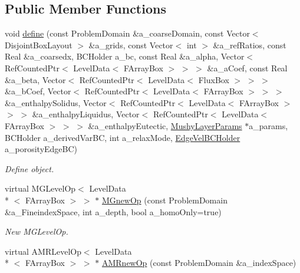 \subsection*{Public Member Functions}
\begin{DoxyCompactItemize}
\item 
void \hyperlink{class_a_m_r_non_linear_multi_comp_op_factory_a197bda0900c2f6315d509a8176b738df}{define} (const Problem\-Domain \&a\-\_\-coarse\-Domain, const Vector$<$ Disjoint\-Box\-Layout $>$ \&a\-\_\-grids, const Vector$<$ int $>$ \&a\-\_\-ref\-Ratios, const Real \&a\-\_\-coarsedx, B\-C\-Holder a\-\_\-bc, const Real \&a\-\_\-alpha, Vector$<$ Ref\-Counted\-Ptr$<$ Level\-Data$<$ F\-Array\-Box $>$ $>$ $>$ \&a\-\_\-a\-Coef, const Real \&a\-\_\-beta, Vector$<$ Ref\-Counted\-Ptr$<$ Level\-Data$<$ Flux\-Box $>$ $>$ $>$ \&a\-\_\-b\-Coef, Vector$<$ Ref\-Counted\-Ptr$<$ Level\-Data$<$ F\-Array\-Box $>$ $>$ $>$ \&a\-\_\-enthalpy\-Solidus, Vector$<$ Ref\-Counted\-Ptr$<$ Level\-Data$<$ F\-Array\-Box $>$ $>$ $>$ \&a\-\_\-enthalpy\-Liquidus, Vector$<$ Ref\-Counted\-Ptr$<$ Level\-Data$<$ F\-Array\-Box $>$ $>$ $>$ \&a\-\_\-enthalpy\-Eutectic, \hyperlink{class_mushy_layer_params}{Mushy\-Layer\-Params} $\ast$a\-\_\-params, B\-C\-Holder a\-\_\-derived\-Var\-B\-C, int a\-\_\-relax\-Mode, \hyperlink{class_edge_vel_b_c_holder}{Edge\-Vel\-B\-C\-Holder} a\-\_\-porosity\-Edge\-B\-C)
\begin{DoxyCompactList}\small\item\em Define object. \end{DoxyCompactList}\item 
virtual M\-G\-Level\-Op$<$ Level\-Data\\*
$<$ F\-Array\-Box $>$ $>$ $\ast$ \hyperlink{class_a_m_r_non_linear_multi_comp_op_factory_a4a0bf3a8d0337e5a42ce03648779bc73}{M\-Gnew\-Op} (const Problem\-Domain \&a\-\_\-\-Fineindex\-Space, int a\-\_\-depth, bool a\-\_\-homo\-Only=true)
\begin{DoxyCompactList}\small\item\em New M\-G\-Level\-Op. \end{DoxyCompactList}\item 
\hypertarget{class_a_m_r_non_linear_multi_comp_op_factory_aa9a0f8df336179fba6a0ccb390914c55}{virtual A\-M\-R\-Level\-Op$<$ Level\-Data\\*
$<$ F\-Array\-Box $>$ $>$ $\ast$ \hyperlink{class_a_m_r_non_linear_multi_comp_op_factory_aa9a0f8df336179fba6a0ccb390914c55}{A\-M\-Rnew\-Op} (const Problem\-Domain \&a\-\_\-index\-Space)}\label{class_a_m_r_non_linear_multi_comp_op_factory_aa9a0f8df336179fba6a0ccb390914c55}


\end{DoxyCompactItemize}
